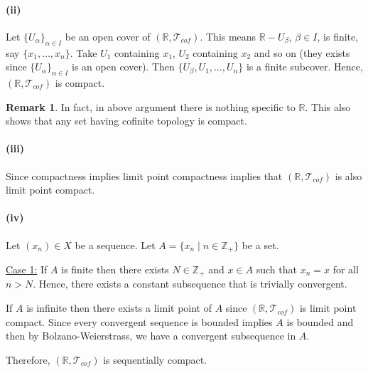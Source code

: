\documentclass[12pt,reqno]{amsart}
\theoremstyle{plain}
\theoremstyle{definition}
\newtheorem{rem}{Remark}
\newcommand{\bb}[1]{\mathbb{#1}}
\newcommand{\cal}[1]{\mathcal{#1}}
\begin{document}
\paragraph{(ii)} Let $\{U_\alpha\}_{\alpha \in I}$ be an open cover of $(\bb R, \cal T_{cof})$. This means $\bb R - U_\beta$, $\beta\in I$, is finite, say $\{x_1, \dots, x_n\}$. Take $U_1$ containing $x_1$, $U_2$ containing $x_2$ and so on (they exists since $\{U_\alpha\}_{\alpha \in I}$ is an open cover). Then $\{U_\beta, U_1, \dots, U_n\}$ is a finite subcover. Hence, $(\bb R, \cal T_{cof})$ is compact.

\begin{rem}
    In fact, in above argument there is nothing specific to $\bb R$. This also shows that any set having cofinite topology is compact.
\end{rem}

\paragraph{(iii)} Since compactness implies limit point compactness implies that $(\bb R, \cal T_{cof})$ is also limit point compact.

\paragraph{(iv)} Let $(x_n) \in X$ be a sequence. Let $A = \{x_n \mid n \in \bb Z_+\}$ be a set. 

\noindent \underline{Case 1:} If $A$ is finite then there exists $N \in \bb Z_+$ and $x \in A$ such that $x_n = x$ for all $n > N$. Hence, there exists a constant subsequence that is trivially convergent.

\noindent {} If $A$ is infinite then there exists a limit point of $A$ since $(\bb R, \cal T_{cof})$ is limit point compact. Since every convergent sequence is bounded implies $A$ is bounded and then by Bolzano-Weierstrass, we have a convergent subsequence in $A$.

Therefore, $(\bb R, \cal T_{cof})$ is sequentially compact.
\end{document}
